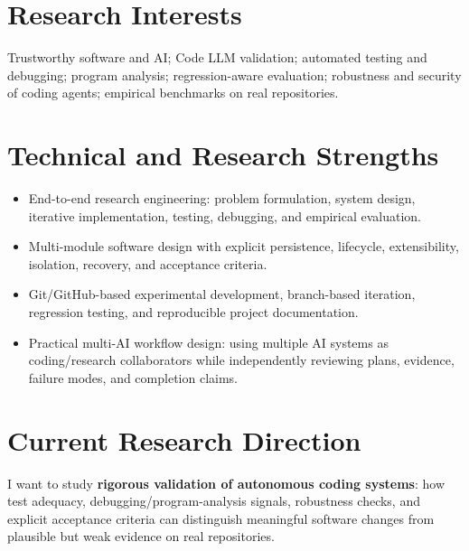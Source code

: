 \documentclass[10pt,a4paper]{article}
\begin{document}
\section{Research Interests}
Trustworthy software and AI; Code LLM validation; automated testing and debugging; program analysis; regression-aware evaluation; robustness and security of coding agents; empirical benchmarks on real repositories.

\section{Technical and Research Strengths}
\begin{itemize}
  \item End-to-end research engineering: problem formulation, system design, iterative implementation, testing, debugging, and empirical evaluation.
  \item Multi-module software design with explicit persistence, lifecycle, extensibility, isolation, recovery, and acceptance criteria.
  \item Git/GitHub-based experimental development, branch-based iteration, regression testing, and reproducible project documentation.
  \item Practical multi-AI workflow design: using multiple AI systems as coding/research collaborators while independently reviewing plans, evidence, failure modes, and completion claims.
\end{itemize}

\section{Current Research Direction}
I want to study \textbf{rigorous validation of autonomous coding systems}: how test adequacy, debugging/program-analysis signals, robustness checks, and explicit acceptance criteria can distinguish meaningful software changes from plausible but weak evidence on real repositories.
\end{document}

